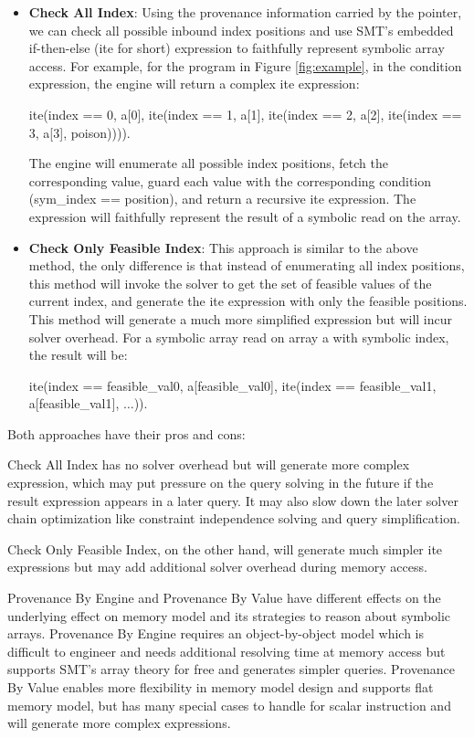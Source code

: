 \documentclass[sigplan, nonacm]{acmart}\settopmatter{printfolios=true,printccs=false,printacmref=false}
\begin{document}
\begin{itemize}
  \item \textbf{Check All Index}: Using the provenance information carried by the pointer, we can check all possible inbound index positions and use SMT's embedded if-then-else (ite for short) expression to faithfully represent symbolic array access. For example, for the program in Figure \ref{fig:example}, in the condition expression, the engine will return a complex ite expression: \par ite(index == 0, a[0], ite(index == 1, a[1], ite(index == 2, a[2], ite(index == 3, a[3], poison)))). \par
  The engine will enumerate all possible index positions, fetch the corresponding value, guard each value with the corresponding condition (sym\_index == position), and return a recursive ite expression. The expression will faithfully represent the result of a symbolic read on the array.
  \item \textbf{Check Only Feasible Index}: This approach is similar to the above method, the only difference is that instead of enumerating all index positions, this method will invoke the solver to get the set of feasible values of the current index, and generate the ite expression with only the feasible positions. This method will generate a much more simplified expression but will incur solver overhead. For a symbolic array read on array a with symbolic index, the result will be: \par ite(index == feasible\_val0, a[feasible\_val0], ite(index == feasible\_val1, a[feasible\_val1], $\dots$)). \par
\end{itemize}
Both approaches have their pros and cons: \par Check All Index has no solver overhead but will generate more complex expression, which may put pressure on the query solving in the future if the result expression appears in a later query. It may also slow down the later solver chain optimization like constraint independence solving and query simplification.\par
Check Only Feasible Index, on the other hand, will generate much simpler ite expressions but may add additional solver overhead during memory access.\par
Provenance By Engine and Provenance By Value have different effects on the underlying effect on memory model and its strategies to reason about symbolic arrays. Provenance By Engine requires an object-by-object model which is difficult to engineer and needs additional resolving time at memory access but supports SMT's array theory for free and generates simpler queries. Provenance By Value enables more flexibility in memory model design and supports flat memory model, but has many special cases to handle for scalar instruction and will generate more complex expressions.
\end{document}
